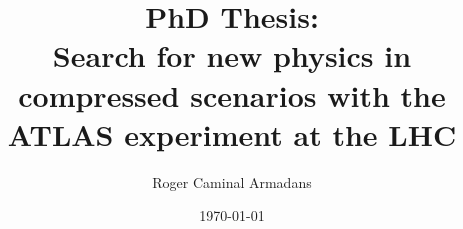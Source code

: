 \documentclass[a4paper,11pt,twoside]{report}
\begin{document}

\setcounter{page}{0}


\title{PhD Thesis: \\ Search for new physics in compressed scenarios with the ATLAS experiment at the LHC}
\author{Roger Caminal Armadans}
\date{\today \\ \currenttime}


\newpage
$\,$
\clearpage
\newpage


\cleardoublepage


\tableofcontents
\cleardoublepage   %

\setcounter{page}{1}
\acresetall %


\cleardoublepage


\cleardoublepage


\cleardoublepage


\cleardoublepage


\cleardoublepage


\cleardoublepage


\cleardoublepage


\cleardoublepage


\cleardoublepage

\appendix


\cleardoublepage


\cleardoublepage
\end{document}
